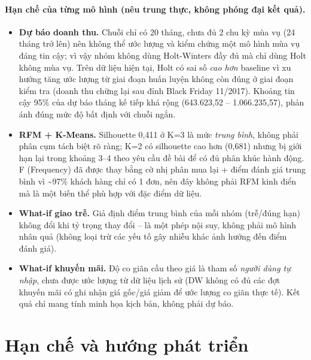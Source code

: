 \documentclass[12pt,a4paper]{article}
\begin{document}
\paragraph{Hạn chế của từng mô hình (nêu trung thực, không phóng đại kết quả).}
\begin{itemize}[nosep]
  \item \textbf{Dự báo doanh thu.} Chuỗi chỉ có 20 tháng, chưa đủ 2 chu kỳ mùa vụ (24 tháng trở lên) nên không
        thể ước lượng và kiểm chứng một mô hình mùa vụ đáng tin cậy; vì vậy nhóm không dùng Holt-Winters đầy
        đủ mà chỉ dùng Holt không mùa vụ. Trên dữ liệu hiện tại, Holt có sai số \emph{cao hơn} baseline vì
        xu hướng tăng ước lượng từ giai đoạn huấn luyện không còn đúng ở giai đoạn kiểm tra (doanh thu chững
        lại sau đỉnh Black Friday 11/2017). Khoảng tin cậy 95\% của dự báo tháng kế tiếp khá rộng
        (643.623,52 -- 1.066.235,57), phản ánh đúng mức độ bất định với chuỗi ngắn.
  \item \textbf{RFM + K-Means.} Silhouette 0,411 ở K=3 là mức \emph{trung bình}, không phải phân cụm tách biệt
        rõ ràng; K=2 có silhouette cao hơn (0,681) nhưng bị giới hạn lại trong khoảng 3--4 theo yêu cầu đề bài
        để có đủ phân khúc hành động. F (Frequency) đã được thay bằng cờ nhị phân mua lại + điểm đánh giá
        trung bình vì \textasciitilde 97\% khách hàng chỉ có 1 đơn, nên đây không phải RFM kinh điển mà là một
        biến thể phù hợp với đặc điểm dữ liệu.
  \item \textbf{What-if giao trễ.} Giả định điểm trung bình của mỗi nhóm (trễ/đúng hạn) không đổi khi tỷ trọng
        thay đổi -- là một phép nội suy, không phải mô hình nhân quả (không loại trừ các yếu tố gây nhiễu khác
        ảnh hưởng đến điểm đánh giá).
  \item \textbf{What-if khuyến mãi.} Độ co giãn cầu theo giá là tham số \emph{người dùng tự nhập}, chưa được
        ước lượng từ dữ liệu lịch sử (DW không có đủ các đợt khuyến mãi có ghi nhận giá gốc/giá giảm để ước
        lượng co giãn thực tế). Kết quả chỉ mang tính minh họa kịch bản, không phải dự báo.
\end{itemize}

\section{Hạn chế và hướng phát triển}
\end{document}
